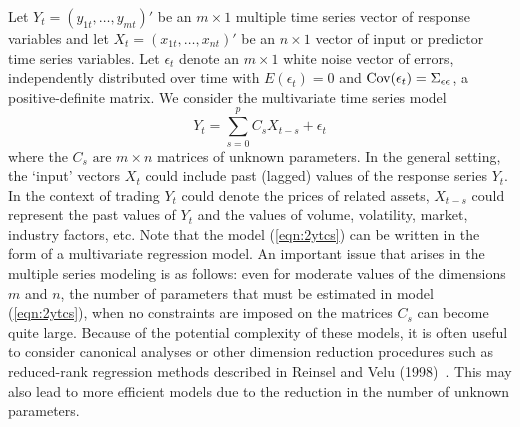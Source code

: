 Let $Y_t=(y_{1t},\ldots, y_{mt})'$ be an $m \times 1$ multiple time series vector of response variables and let $X_t=(x_{1t}, \ldots, x_{nt})'$ be an $n \times 1$ vector of input or predictor time series variables. Let $\epsilon_t$ denote an $m \times 1$ white noise vector of errors, independently distributed over time with $E(\epsilon_t)=0$ and $\operatorname{Cov}(\epsilon_t)=\Sigma_{\epsilon\epsilon}$, a positive-definite matrix. We consider the multivariate time series model
	\begin{equation}\label{eqn:2ytcs}
	Y_{t} = \sum_{s=0}^{p}C_sX_{t-s}+\epsilon_t 
	\end{equation}
where the $C_s \text{ are } m\times n$ matrices of unknown parameters. In the general setting, the `input' vectors $X_t$ could include past (lagged) values of the response series $Y_t$. In the context of trading $Y_t$ could denote the prices of related assets, $X_{t-s}$ could represent the past values of $Y_t$ and the values of volume, volatility, market, industry factors, etc. Note that the model (\ref{eqn:2ytcs}) can be written in the form of a multivariate regression model. An important issue that arises in the multiple series modeling is as follows: even for moderate values of the dimensions $m$ and $n$, the number of parameters that must be estimated in model (\ref{eqn:2ytcs}), when no constraints are imposed on the matrices $C_s$ can become quite large. Because of the potential complexity of these models, it is often useful to consider canonical analyses or other dimension reduction procedures such as reduced-rank regression methods described in Reinsel and Velu (1998)~\cite{velurein}. This may also lead to more efficient models due to the reduction in the number of unknown parameters.


